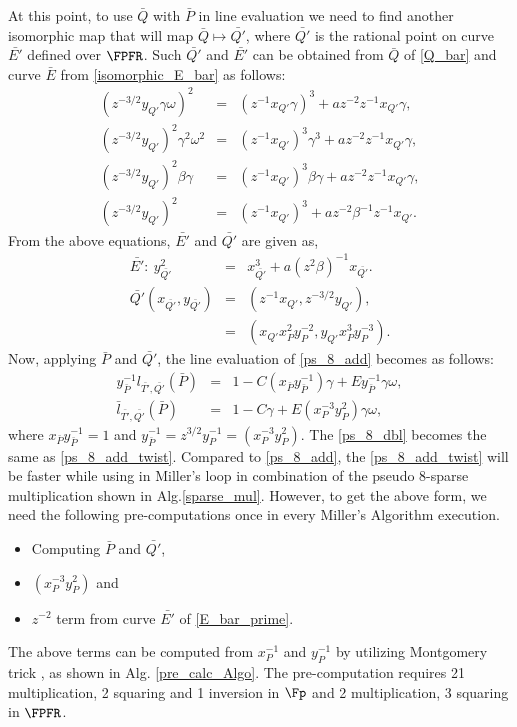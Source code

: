 At this point, to use $\bar{Q}$ with $\bar{P}$ in line evaluation we need to find another isomorphic map that will map $\bar{Q} \mapsto \bar{Q'}$, where $\bar{Q'}$ is the rational point on curve  $\bar{E'}$ defined over $\FPFR$. Such $\bar{Q'}$ and $\bar{E'}$ can be obtained from $\bar{Q}$ of \eqref{Q_bar} and curve $\bar{E}$ from \eqref{isomorphic_E_bar} as follows:
\begin{eqnarray} 
(z^{-3/2}y_{Q'}\gamma \omega )^2 &=& (z^{-1}x_{Q'}\gamma)^3+az^{-2}z^{-1}x_{Q'}\gamma, \nonumber \\
(z^{-3/2}y_{Q'})^2\gamma^2 \omega^2 &=& (z^{-1}x_{Q'})^3\gamma^3+az^{-2}z^{-1}x_{Q'}\gamma, \nonumber \\
(z^{-3/2}y_{Q'})^2 \beta \gamma &=& (z^{-1}x_{Q'})^3 \beta \gamma+az^{-2}z^{-1}x_{Q'}\gamma, \nonumber \\
(z^{-3/2}y_{Q'})^2  &=& (z^{-1}x_{Q'})^3+az^{-2}\beta^{-1} z^{-1}x_{Q'}. \nonumber
\end{eqnarray}
From the above equations, $\bar{E'}$ and $\bar{Q'}$ are given as,
\begin{eqnarray}
\bar{E'}: ~y_{\bar{Q'}}^2 & = & x_{\bar{Q'}}^3+a(z^2\beta)^{-1}x_{\bar{Q'}}. \label{E_bar_prime}\\
\bar{Q'}(x_{\bar{Q'}}, y_{\bar{Q'}}) & = & (z^{-1}x_{Q'}, z^{-3/2}y_{Q'}), \nonumber \\
& = &(x_{Q'} x_P^2y_P^{-2},y_{Q'} x_P^3y_{P}^{-3}) \label{Q_bar_prime}. 
\end{eqnarray}
Now, applying $\bar{P}$ and $\bar{Q'}$, the line evaluation of  \eqref{ps_8_add} becomes as follows:
\begin{eqnarray}
y_{\bar{P}}^{-1} l_{\bar{T'},\bar{Q'}}(\bar{P})&=& 1-C(x_{\bar{P}}y_{\bar{P}}^{-1})\gamma+E y_{\bar{P}}^{-1}\gamma \omega,  \nonumber \\
\bar{l}_{\bar{T'},\bar{Q'}}(\bar{P}) &=& 1 -C\gamma+E (x_{P}^{-3} y_{P}^2)\gamma \omega, \label{ps_8_add_twist}
\end{eqnarray}
where $x_{\bar{P}}y_{\bar{P}}^{-1}=1$ and $y_{\bar{P}}^{-1} = z^{3/2}y_{P}^{-1}=(x_{P}^{-3} y_{P}^2)$. The \eqref{ps_8_dbl} becomes the same as \eqref{ps_8_add_twist}. 
Compared to \eqref{ps_8_add}, the \eqref{ps_8_add_twist} will be faster while using in Miller's loop in combination of the pseudo 8-sparse multiplication shown in Alg.\ref{sparse_mul}.
However, to get the above form, we need the following pre-computations once in every Miller's Algorithm execution.
\begin{itemize}
\item Computing $\bar{P}$ and $\bar{Q'}$,
\item $(x_{P}^{-3} y_{P}^{2})$ and
\item $z^{-2}$ term from curve $\bar{E'}$ of \eqref{E_bar_prime}.
\end{itemize}
The above terms can be computed from $x_{P}^{-1}$ and $y_P^{-1}$ by utilizing Montgomery trick \cite{mont_trick}, as shown in Alg. \ref{pre_calc_Algo}. 
The pre-computation requires 21 multiplication, 2 squaring and 1 inversion in $\Fp$ and 2 multiplication, 3 squaring  in $\FPFR$.

